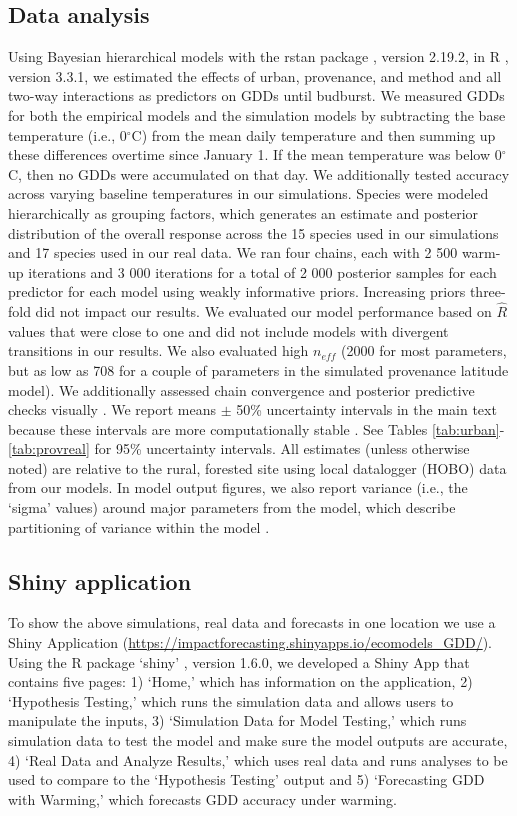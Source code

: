 \documentclass{article}\usepackage[]{graphicx}\usepackage[]{color}
\begin{document}
\subsection*{Data analysis}
Using Bayesian hierarchical models with the rstan package \citep{rstan2019}, version 2.19.2,  in R \citep{R}, version 3.3.1, we estimated the effects of urban, provenance, and method and all two-way interactions as predictors on GDDs until budburst. We measured GDDs for both the empirical models and the simulation models by subtracting the base temperature (i.e., 0$^{\circ}$C) from the mean daily temperature and then summing up these differences overtime \citep{Asse2018} since January 1. If the mean temperature was below 0$^{\circ}$C, then no GDDs were accumulated on that day. We additionally tested accuracy across varying baseline temperatures in our simulations. Species were modeled hierarchically as grouping factors, which generates an estimate and posterior distribution of the overall response across the 15 species used in our simulations and 17 species used in our real data. We ran four chains, each with 2 500 warm-up iterations and 3 000 iterations for a total of 2 000 posterior samples for each predictor for each model using weakly informative priors. Increasing priors three-fold did not impact our results. We evaluated our model performance based on $\hat{R}$ values that were close to one and did not include models with divergent transitions in our results. We also evaluated high $n_{eff}$ (2000 for most parameters, but as low as 708 for a couple of parameters in the simulated provenance latitude model). We additionally assessed chain convergence and posterior predictive checks visually \citep{BDA}. We report means $\pm$ 50\% uncertainty intervals in the main text because these intervals are more computationally stable \citep{BDA,Carpenter2017}. See Tables \ref{tab:urban}-\ref{tab:provreal} for 95\% uncertainty intervals. All estimates (unless otherwise noted) are relative to the rural, forested site using local datalogger (HOBO) data from our models. In model output figures, we also report variance (i.e., the `sigma' values) around major parameters from the model, which describe partitioning of variance within the model \citep{BDA}. 

\subsection*{Shiny application}
To show the above simulations, real data and forecasts in one location we use a Shiny Application (\url{https://impactforecasting.shinyapps.io/ecomodels_GDD/}). Using the R package `shiny' \citep{shiny2021}, version 1.6.0, we developed a Shiny App that contains five pages: 1) `Home,' which has information on the application, 2) `Hypothesis Testing,' which runs the simulation data and allows users to manipulate the inputs, 3) `Simulation Data for Model Testing,' which runs simulation data to test the model and make sure the model outputs are accurate, 4) `Real Data and Analyze Results,' which uses real data and runs analyses to be used to compare to the `Hypothesis Testing' output and 5) `Forecasting GDD with Warming,' which forecasts GDD accuracy under warming. 
\end{document}
